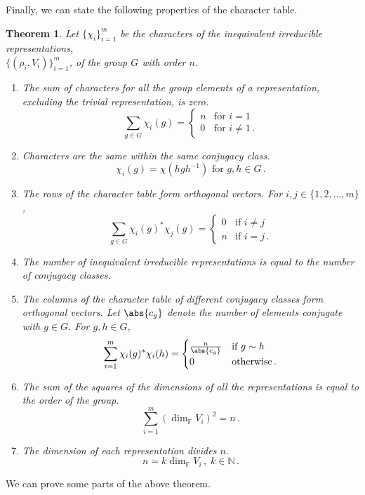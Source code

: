 \documentclass{article}
\theoremstyle{plain}\theoremheaderfont{\normalfont\itshape}\theorembodyfont{\rmfamily}\theoremseparator{.}\newtheorem*{rem}{Remark}\newtheorem*{ex}{Example}\newtheorem*{proof}{Proof}\newtheorem*{altp}{Alternative proof}
\theoremstyle{plain}\theoremheaderfont{\normalfont\bfseries}\theorembodyfont{\rmfamily}\theoremseparator{.}\newtheorem{thm}{Theorem}[section]\newtheorem{lem}[thm]{Lemma}\newtheorem{prop}[thm]{Proposition}\newtheorem*{cor}{Corollary}\newtheorem{defn}[thm]{Definition}\newtheorem{clm}[thm]{Claim}\newtheorem{clminproof}{Claim}
\theoremstyle{break}\theoremheaderfont{\normalfont\itshape}\theorembodyfont{\rmfamily}\theoremseparator{.\medskip}\newtheorem*{proofskip}{Proof}\newtheorem*{exs}{Examples}\newtheorem*{rems}{Remarks}
\theoremstyle{break}\theoremheaderfont{\normalfont\bfseries}\theorembodyfont{\rmfamily}\theoremseparator{.\medskip}\newtheorem{lemskip}[thm]{Lemma}\newtheorem{defnskip}[thm]{Definition}\newtheorem{propskip}[thm]{Proposition}\newtheorem{thmskip}[thm]{Theorem}
\numberwithin{equation}{section}
\begin{document}
	Finally, we can state the following properties of the character table.
	\begin{thm}\label{chatable}
		Let \(\{\chi_i\}_{i=1}^{m}\) be the characters of the inequivalent irreducible representations, \\\(\{(\rho_i,V_i)\}_{i=1}^{m}\), of the group \(G\) with order \(n\).
		\begin{enumerate}[topsep=0pt]
			\item[(i)] The sum of characters for all the group elements of a representation, excluding the trivial representation, is zero.
			\[\sum_{g\in G}\chi_i(g)=\begin{cases}
				n & \text{for }i=1\\
				0 & \text{for }i\ne 1\,.
			\end{cases}\]
			\item[(ii)] Characters are the same within the same conjugacy class.
			\[\chi_i(g)=\chi(hgh^{-1})\text{ for }g,h\in G\,.\]
			\item[(iii)] The rows of the character table form orthogonal vectors. For \(i,j\in\{1,2,...,m\}\),
			\[\sum_{g\in G}\chi_i(g)^*\chi_j(g)=\begin{cases}
				0 & \text{if }i\ne j\\
				n & \text{if }i=j\,.
			\end{cases}\]
			\item[(iv)] The number of inequivalent irreducible representations is equal to the number of conjugacy classes.
			\item[(v)] The columns of the character table of different conjugacy classes form orthogonal vectors. Let \(\abs{c_g}\) denote the number of elements conjugate with \(g\in G\). For \(g,h\in G\),
			\[\sum_{i=1}^{m}\chi_i(g)^*\chi_i(h)=\begin{cases}
				\frac{n}{\abs{c_g}} & \text{if }g\sim h\\
				0 & \text{otherwise}\,.
			\end{cases}\]
			\item[(vi)] The sum of the squares of the dimensions of all the representations is equal to the order of the group.
			\[\sum_{i=1}^{m}(\dim_\mathbb{F}V_i)^2=n\,.\]
			\item[(vii)] The dimension of each representation divides \(n\).
			\[n=k\dim_\mathbb{F}V_i\,,\;k\in\mathbb{N}\,.\]
		\end{enumerate}
	\end{thm}
	We can prove some parts of the above theorem.
\end{document}
